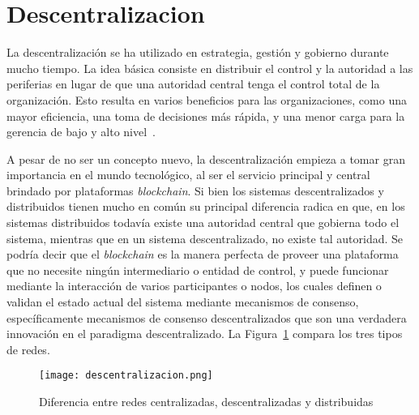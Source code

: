 
\section{Descentralizacion}  %

La descentralización se ha utilizado en  estrategia, gestión y gobierno durante mucho tiempo. La idea básica consiste en distribuir el control y la autoridad a las periferias en lugar de que una autoridad central tenga el control total de la organización. Esto resulta en varios beneficios para las organizaciones, como una mayor eficiencia, una toma de decisiones más rápida, y una menor carga para la gerencia de bajo y alto nivel~\cite{bashir2017mastering}.

A pesar de no ser un concepto nuevo, la descentralización empieza a tomar gran importancia en el mundo tecnológico, al ser el servicio principal y central brindado por plataformas \textit{blockchain}. Si bien los sistemas descentralizados  y distribuidos tienen mucho en común su principal diferencia radica en que, en los sistemas distribuidos todavía existe una autoridad central que gobierna todo el sistema, mientras que en un sistema descentralizado, no existe tal autoridad. Se podría decir que el \textit{blockchain} es la manera perfecta de proveer una  plataforma que no necesite ningún intermediario o entidad de control, y puede funcionar mediante la interacción de varios participantes o nodos, los cuales definen o validan el estado actual del sistema mediante mecanismos de consenso, específicamente mecanismos de consenso descentralizados que son una verdadera innovación en el paradigma descentralizado. La Figura~\ref{blockchain_descentralziation} compara los tres tipos de redes.

\begin{figure}[h]
    \centering
    \texttt{[image: descentralizacion.png]}
     \caption{Diferencia entre redes centralizadas, descentralizadas y distribuidas}
    \label{blockchain_descentralziation}
\end{figure}

